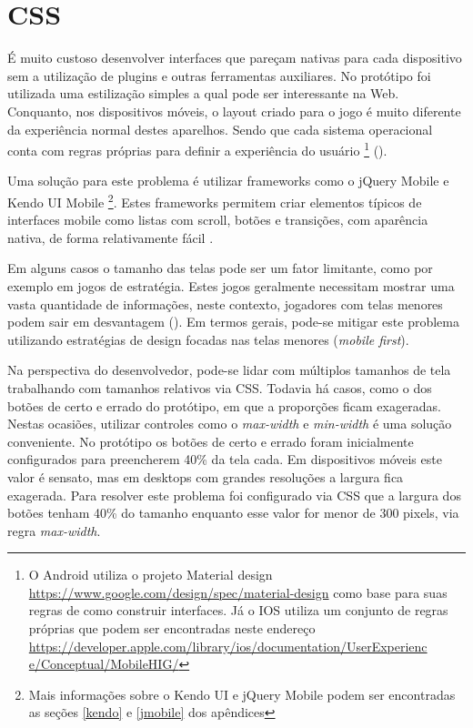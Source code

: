 \section{CSS}

É muito custoso desenvolver interfaces que pareçam nativas
para cada dispositivo sem a utilização de plugins e outras
ferramentas auxiliares. No protótipo foi utilizada uma estilização
simples a qual pode ser interessante na Web. Conquanto, nos
dispositivos móveis, o layout criado para o jogo é muito diferente
da experiência normal destes aparelhos. Sendo que cada sistema
operacional conta com regras próprias para definir a experiência
do usuário \footnote{ O Android utiliza o projeto Material design
\url{https://www.google.com/design/spec/material-design} como base
para suas regras de como construir interfaces. Já o IOS utiliza um
conjunto de regras próprias que podem ser encontradas neste endereço
\url{https://developer.apple.com/library/ios/documentation/UserExperienc
e/Conceptual/MobileHIG/}} ().

Uma solução para este problema é utilizar frameworks como o jQuery
Mobile e Kendo UI Mobile \footnote{Mais informações sobre o Kendo UI
e jQuery Mobile podem ser encontradas as seções \ref{kendo} e \ref{jmobile} dos apêndices}. Estes frameworks
permitem criar elementos típicos de interfaces mobile como listas
com scroll, botões e transições, com aparência nativa, de forma
relativamente fácil \textsc{\autocite{publishHtml5}}.

Em alguns casos o tamanho das telas pode ser um fator limitante,
como por exemplo em jogos de estratégia. Estes jogos geralmente
necessitam mostrar uma vasta quantidade de informações, neste
contexto, jogadores com telas menores podem sair em desvantagem
(). Em
termos gerais, pode-se mitigar este problema utilizando estratégias de
design focadas nas telas menores (\textit{mobile first}).


Na perspectiva do desenvolvedor, pode-se lidar com múltiplos tamanhos
de tela trabalhando com tamanhos relativos via CSS. Todavia há
casos, como o dos botões de certo e errado do protótipo, em que a
proporções ficam exageradas. Nestas ocasiões, utilizar controles como
o \textit{max-width} e \textit{min-width} é uma solução conveniente.
No protótipo os botões de certo e errado foram inicialmente
configurados para preencherem 40\% da tela cada. Em dispositivos móveis
este valor é sensato, mas em desktops com grandes resoluções a
largura fica exagerada. Para resolver este problema foi configurado via
CSS que a largura dos botões tenham 40\% do tamanho enquanto esse valor
for menor de 300 pixels, via regra \textit{max-width}.

